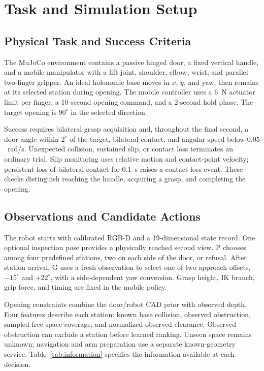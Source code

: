 \section{Task and Simulation Setup}
\label{sec:setup}
\subsection{Physical Task and Success Criteria}
The MuJoCo environment \citep{todorov2012mujoco} contains a passive hinged
door, a fixed vertical handle, and a mobile manipulator with a lift joint,
shoulder, elbow, wrist, and parallel two-finger gripper. An ideal holonomic
base moves in $x$, $y$, and yaw, then remains at its selected station during
opening. The mobile controller uses a 6~N actuator limit per finger, a
10-second opening command, and a 2-second hold phase. The target opening is
$90^\circ$ in the selected direction.

Success requires bilateral grasp acquisition and, throughout the final
second, a door angle within $2^\circ$ of the target, bilateral contact, and
angular speed below $0.05$~rad/s. Unexpected collision, sustained slip, or
contact loss terminates an ordinary trial. Slip monitoring uses relative
motion and contact-point velocity; persistent loss of bilateral contact for
0.1~s raises a contact-loss event. These checks distinguish reaching the
handle, acquiring a grasp, and completing the opening.

\subsection{Observations and Candidate Actions}
The robot starts with calibrated RGB-D and a 19-dimensional state record.
One optional inspection pose provides a physically reached second view. P
chooses among four predefined stations, two on each side of the door, or
refusal. After station arrival, G uses a fresh observation to select one of
two approach offsets, $-15^\circ$ and $+22^\circ$, with a side-dependent yaw
conversion. Grasp height, IK branch, grip force, and timing are fixed in the
mobile policy.

Opening constraints combine the door/robot CAD prior with observed depth.
Four features describe each station: known base collision, observed
obstruction, sampled free-space coverage, and normalized observed clearance.
Observed obstruction can exclude a station before learned ranking. Unseen
space remains unknown; navigation and arm preparation use a separate
known-geometry service. Table~\ref{tab:information} specifies the information
available at each decision.

